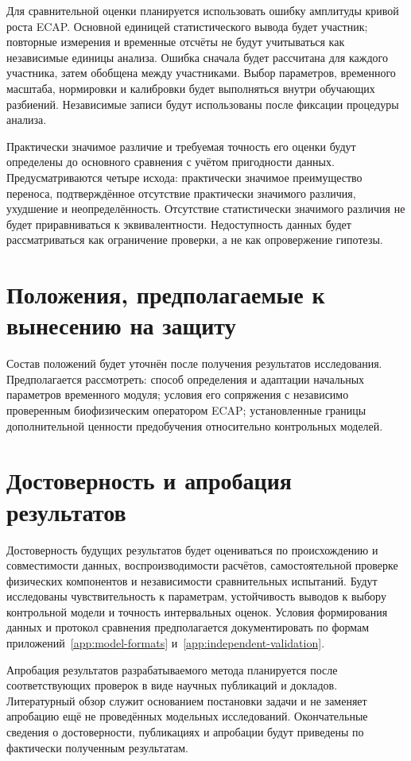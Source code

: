 Для сравнительной оценки планируется использовать ошибку амплитуды кривой роста ECAP. Основной единицей статистического вывода будет участник; повторные измерения и временные отсчёты не будут учитываться как независимые единицы анализа. Ошибка сначала будет рассчитана для каждого участника, затем обобщена между участниками. Выбор параметров, временного масштаба, нормировки и калибровки будет выполняться внутри обучающих разбиений. Независимые записи будут использованы после фиксации процедуры анализа.

Практически значимое различие и требуемая точность его оценки будут определены до основного сравнения с учётом пригодности данных. Предусматриваются четыре исхода: практически значимое преимущество переноса, подтверждённое отсутствие практически значимого различия, ухудшение и неопределённость. Отсутствие статистически значимого различия не будет приравниваться к эквивалентности. Недоступность данных будет рассматриваться как ограничение проверки, а не как опровержение гипотезы.

\section*{Положения, предполагаемые к вынесению на защиту}
Состав положений будет уточнён после получения результатов исследования. Предполагается рассмотреть: способ определения и адаптации начальных параметров временного модуля; условия его сопряжения с независимо проверенным биофизическим оператором ECAP; установленные границы дополнительной ценности предобучения относительно контрольных моделей.

\section*{Достоверность и апробация результатов}
Достоверность будущих результатов будет оцениваться по происхождению и совместимости данных, воспроизводимости расчётов, самостоятельной проверке физических компонентов и независимости сравнительных испытаний. Будут исследованы чувствительность к параметрам, устойчивость выводов к выбору контрольной модели и точность интервальных оценок. Условия формирования данных и протокол сравнения предполагается документировать по формам приложений~\ref{app:model-formats} и~\ref{app:independent-validation}.

Апробация результатов разрабатываемого метода планируется после соответствующих проверок в виде научных публикаций и докладов. Литературный обзор служит основанием постановки задачи и не заменяет апробацию ещё не проведённых модельных исследований. Окончательные сведения о достоверности, публикациях и апробации будут приведены по фактически полученным результатам.

